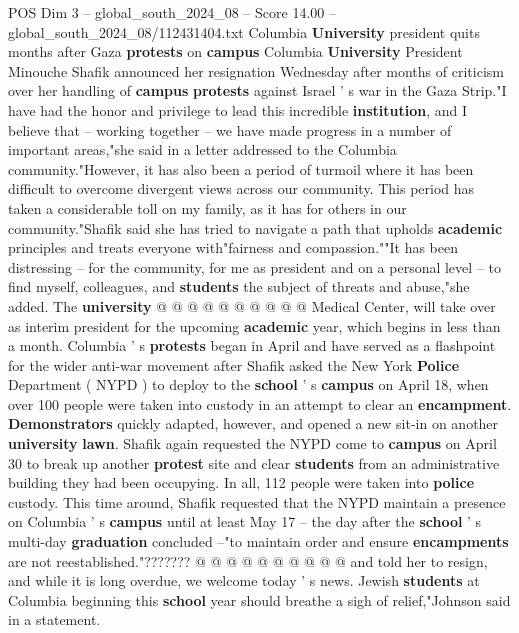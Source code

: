 \begin{textsample}{POS Dim 3 – global\_south\_2024\_08 – Score 14.00 – global\_south\_2024\_08/112431404.txt}  \label{ex:f3_pos_307}
Columbia \textbf{University} president quits months after Gaza \textbf{protests} on \textbf{campus} Columbia \textbf{University} President Minouche Shafik announced her resignation Wednesday after months of criticism over her handling of \textbf{campus} \textbf{protests} against Israel ' s war in the Gaza Strip."I have had the honor and privilege to lead this incredible \textbf{institution}, and I believe that -- working together -- we have made progress in a number of important areas,"she said in a letter addressed to the Columbia community."However, it has also been a period of turmoil where it has been difficult to overcome divergent views across our community.
This period has taken a considerable toll on my family, as it has for others in our community."Shafik said she has tried to navigate a path that upholds \textbf{academic} principles and treats everyone with"fairness and compassion.""It has been distressing -- for the community, for me as president and on a personal level -- to find myself, colleagues, and \textbf{students} the subject of threats and abuse,"she added.
The \textbf{university} @ @ @ @ @ @ @ @ @ @ Medical Center, will take over as interim president for the upcoming \textbf{academic} year, which begins in less than a month.
Columbia ' s \textbf{protests} began in April and have served as a flashpoint for the wider anti-war movement after Shafik asked the New York \textbf{Police} Department ( NYPD ) to deploy to the \textbf{school} ' s \textbf{campus} on April 18, when over 100 people were taken into custody in an attempt to clear an \textbf{encampment}. \textbf{Demonstrators} quickly adapted, however, and opened a new sit-in on another \textbf{university} \textbf{lawn}.
Shafik again requested the NYPD come to \textbf{campus} on April 30 to break up another \textbf{protest} site and clear \textbf{students} from an administrative building they had been occupying.
In all, 112 people were taken into \textbf{police} custody.
This time around, Shafik requested that the NYPD maintain a presence on Columbia ' s \textbf{campus} until at least May 17 -- the day after the \textbf{school} ' s multi-day \textbf{graduation} concluded --"to maintain order and ensure \textbf{encampments} are not reestablished."??????? @ @ @ @ @ @ @ @ @ @ and told her to resign, and while it is long overdue, we welcome today ' s news.
Jewish \textbf{students} at Columbia beginning this \textbf{school} year should breathe a sigh of relief,"Johnson said in a statement.

\end{textsample}
